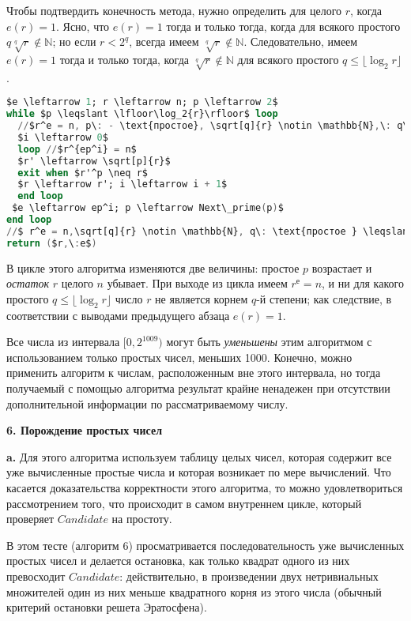 Чтобы подтвердить конечность метода, нужно определить для целого $r$,
когда $e(r) = 1$. Ясно, что $e(r) = 1$ тогда и только тогда, когда для всякого
простого $q \sqrt[q]{r} \notin \mathbb{N}$; но если $r < 2^q$, всегда имеем $\sqrt[q]{r} \notin \mathbb{N}$.
Следовательно, имеем $e(r) = 1$ тогда и только тогда, когда $\sqrt[q]{r} \notin \mathbb{N}$ для всякого простого $q \leqslant \lfloor\log_2{r}\rfloor$.

\begin{lstlisting}[mathescape=true, language=Ada, caption=Вычисление корня из целого числа]
$e \leftarrow 1; r \leftarrow n; p \leftarrow 2$
while $p \leqslant \lfloor\log_2{r}\rfloor$ loop
  //$r^e = n, p\: - \text{простое}, \sqrt[q]{r} \notin \mathbb{N},\: q\: \text{простое} < q$
  $i \leftarrow 0$
  loop //$r^{ep^i} = n$
  $r' \leftarrow \sqrt[p]{r}$
  exit when $r'^p \neq r$
  $r \leftarrow r'; i \leftarrow i + 1$
  end loop
 $e \leftarrow ep^i; p \leftarrow Next\_prime(p)$
end loop
//$ r^e = n,\sqrt[q]{r} \notin \mathbb{N}, q\: \text{простое } \leqslant\log_2{(r)},\: \text{значит}\: e(r) = 1$
return ($r,\:e$)
\end{lstlisting} 

В цикле этого алгоритма изменяются две величины: простое $p$ возрастает
и \textit{остаток} $r$ целого $n$ убывает. При выходе из цикла имеем $r^е = n$, и ни для
какого простого $q \leqslant \lfloor\log_2{r}\rfloor$ число $r$ не является корнем $q$-й степени; как следствие,
в соответствии с выводами предыдущего абзаца $e(r) = 1$.

Все числа из интервала $[0, 2^{1009})$ могут быть \textit{уменьшены} этим алгоритмом с использованием
только простых чисел, меньших 1000. Конечно, можно применить алгоритм к числам, расположенным
вне этого интервала, но тогда получаемый с помощью алгоритма результат крайне ненадежен при отсутствии
дополнительной информации по рассматриваемому числу.\newline

\noindent\textbf{6. Порождение простых чисел}\newline

\textbf{a.} Для этого алгоритма используем таблицу целых чисел, которая содержит
все уже вычисленные простые числа и которая возникает по мере вычислений.
Что касается доказательства корректности этого алгоритма, то можно удовлетвориться
рассмотрением того, что происходит в самом внутреннем цикле, который проверяет $Candidate$ на простоту.
\newpage

В этом тесте (алгоритм 6) просматривается последовательность уже вычисленных
простых чисел и делается остановка, как только квадрат одного из них превосходит $Candidate$:
действительно, в произведении двух нетривиальных множителей один из них меньше
квадратного корня из этого числа (обычный критерий остановки решета Эратосфена).

